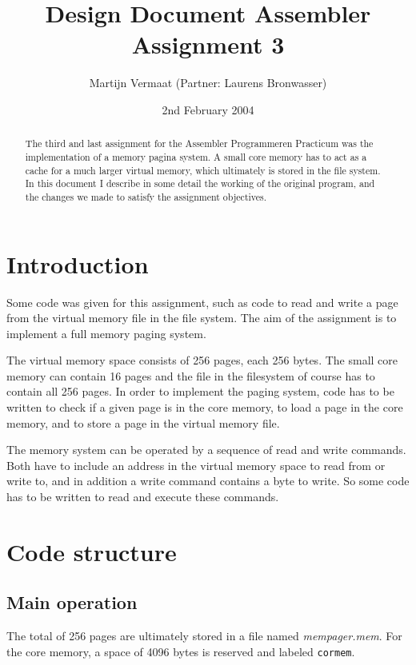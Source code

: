 \documentclass[11pt]{article}
\title{Design Document Assembler Assignment 3}
\author{
    Martijn Vermaat (Partner: Laurens Bronwasser)
}
\date{2nd February 2004}
\begin{document}
\maketitle

\begin{abstract}
The third and last assignment for the Assembler Programmeren Practicum was the implementation of a memory pagina system. A small core memory has to act as a cache for a much larger virtual memory, which ultimately is stored in the file system. In this document I describe in some detail the working of the original program, and the changes we made to satisfy the assignment objectives.
\end{abstract}

\tableofcontents

\newpage

\section{Introduction}

Some code was given for this assignment, such as code to read and write a page from the virtual memory file in the file system. The aim of the assignment is to implement a full memory paging system.

The virtual memory space consists of 256 pages, each 256 bytes. The small core memory can contain 16 pages and the file in the filesystem of course has to contain all 256 pages. In order to implement the paging system, code has to be written to check if a given page is in the core memory, to load a page in the core memory, and to store a page in the virtual memory file.

The memory system can be operated by a sequence of read and write commands. Both have to include an address in the virtual memory space to read from or write to, and in addition a write command contains a byte to write. So some code has to be written to read and execute these commands.


\section{Code structure}

\subsection{Main operation}

The total of 256 pages are ultimately stored in a file named \emph{mempager.mem}. For the core memory, a space of 4096 bytes is reserved and labeled \verb|cormem|.
\end{document}
